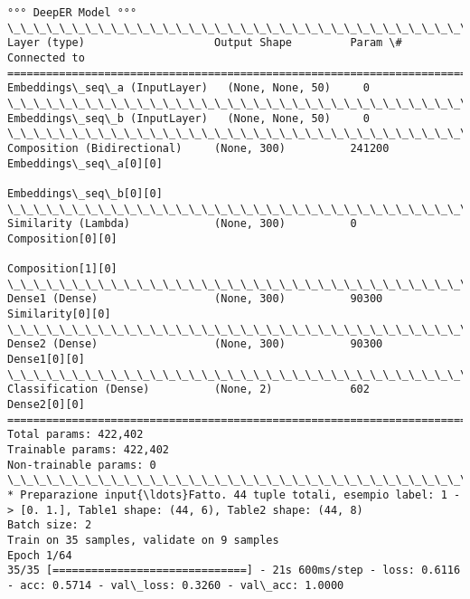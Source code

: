 \documentclass[11pt]{article}
\begin{document}
\begin{Verbatim}[commandchars=\\\{\}]
°°° DeepER Model °°°
\_\_\_\_\_\_\_\_\_\_\_\_\_\_\_\_\_\_\_\_\_\_\_\_\_\_\_\_\_\_\_\_\_\_\_\_\_\_\_\_\_\_\_\_\_\_\_\_\_\_\_\_\_\_\_\_\_\_\_\_\_\_\_\_\_\_\_\_\_\_\_\_\_\_\_\_\_\_\_\_\_\_\_\_\_\_\_\_\_\_\_\_\_\_\_\_\_\_
Layer (type)                    Output Shape         Param \#     Connected to                     
==================================================================================================
Embeddings\_seq\_a (InputLayer)   (None, None, 50)     0                                            
\_\_\_\_\_\_\_\_\_\_\_\_\_\_\_\_\_\_\_\_\_\_\_\_\_\_\_\_\_\_\_\_\_\_\_\_\_\_\_\_\_\_\_\_\_\_\_\_\_\_\_\_\_\_\_\_\_\_\_\_\_\_\_\_\_\_\_\_\_\_\_\_\_\_\_\_\_\_\_\_\_\_\_\_\_\_\_\_\_\_\_\_\_\_\_\_\_\_
Embeddings\_seq\_b (InputLayer)   (None, None, 50)     0                                            
\_\_\_\_\_\_\_\_\_\_\_\_\_\_\_\_\_\_\_\_\_\_\_\_\_\_\_\_\_\_\_\_\_\_\_\_\_\_\_\_\_\_\_\_\_\_\_\_\_\_\_\_\_\_\_\_\_\_\_\_\_\_\_\_\_\_\_\_\_\_\_\_\_\_\_\_\_\_\_\_\_\_\_\_\_\_\_\_\_\_\_\_\_\_\_\_\_\_
Composition (Bidirectional)     (None, 300)          241200      Embeddings\_seq\_a[0][0]           
                                                                 Embeddings\_seq\_b[0][0]           
\_\_\_\_\_\_\_\_\_\_\_\_\_\_\_\_\_\_\_\_\_\_\_\_\_\_\_\_\_\_\_\_\_\_\_\_\_\_\_\_\_\_\_\_\_\_\_\_\_\_\_\_\_\_\_\_\_\_\_\_\_\_\_\_\_\_\_\_\_\_\_\_\_\_\_\_\_\_\_\_\_\_\_\_\_\_\_\_\_\_\_\_\_\_\_\_\_\_
Similarity (Lambda)             (None, 300)          0           Composition[0][0]                
                                                                 Composition[1][0]                
\_\_\_\_\_\_\_\_\_\_\_\_\_\_\_\_\_\_\_\_\_\_\_\_\_\_\_\_\_\_\_\_\_\_\_\_\_\_\_\_\_\_\_\_\_\_\_\_\_\_\_\_\_\_\_\_\_\_\_\_\_\_\_\_\_\_\_\_\_\_\_\_\_\_\_\_\_\_\_\_\_\_\_\_\_\_\_\_\_\_\_\_\_\_\_\_\_\_
Dense1 (Dense)                  (None, 300)          90300       Similarity[0][0]                 
\_\_\_\_\_\_\_\_\_\_\_\_\_\_\_\_\_\_\_\_\_\_\_\_\_\_\_\_\_\_\_\_\_\_\_\_\_\_\_\_\_\_\_\_\_\_\_\_\_\_\_\_\_\_\_\_\_\_\_\_\_\_\_\_\_\_\_\_\_\_\_\_\_\_\_\_\_\_\_\_\_\_\_\_\_\_\_\_\_\_\_\_\_\_\_\_\_\_
Dense2 (Dense)                  (None, 300)          90300       Dense1[0][0]                     
\_\_\_\_\_\_\_\_\_\_\_\_\_\_\_\_\_\_\_\_\_\_\_\_\_\_\_\_\_\_\_\_\_\_\_\_\_\_\_\_\_\_\_\_\_\_\_\_\_\_\_\_\_\_\_\_\_\_\_\_\_\_\_\_\_\_\_\_\_\_\_\_\_\_\_\_\_\_\_\_\_\_\_\_\_\_\_\_\_\_\_\_\_\_\_\_\_\_
Classification (Dense)          (None, 2)            602         Dense2[0][0]                     
==================================================================================================
Total params: 422,402
Trainable params: 422,402
Non-trainable params: 0
\_\_\_\_\_\_\_\_\_\_\_\_\_\_\_\_\_\_\_\_\_\_\_\_\_\_\_\_\_\_\_\_\_\_\_\_\_\_\_\_\_\_\_\_\_\_\_\_\_\_\_\_\_\_\_\_\_\_\_\_\_\_\_\_\_\_\_\_\_\_\_\_\_\_\_\_\_\_\_\_\_\_\_\_\_\_\_\_\_\_\_\_\_\_\_\_\_\_
* Preparazione input{\ldots}Fatto. 44 tuple totali, esempio label: 1 -> [0. 1.], Table1 shape: (44, 6), Table2 shape: (44, 8)
Batch size: 2
Train on 35 samples, validate on 9 samples
Epoch 1/64
35/35 [==============================] - 21s 600ms/step - loss: 0.6116 - acc: 0.5714 - val\_loss: 0.3260 - val\_acc: 1.0000


\end{Verbatim}
\end{document}

